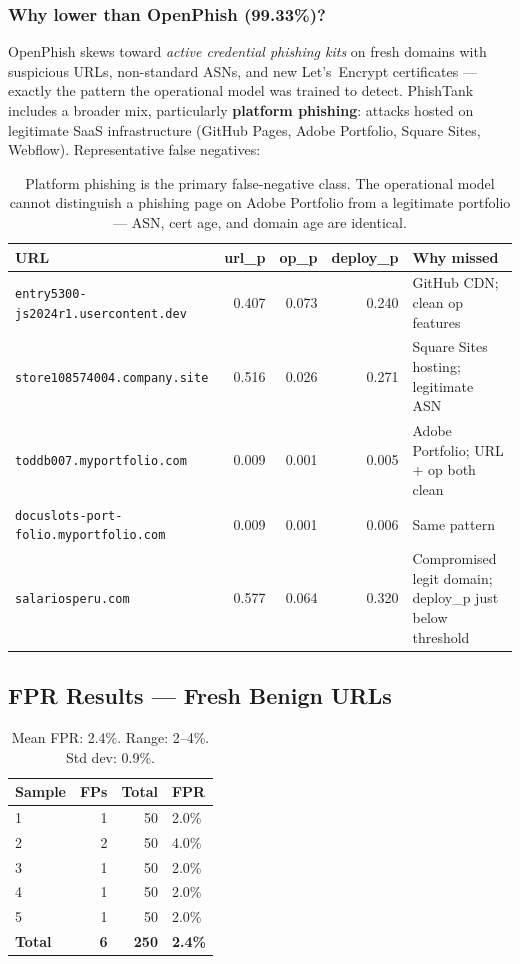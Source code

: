 \documentclass[11pt,a4paper]{article}
\newcommand{\code}[1]{\texttt{#1}}
\begin{document}
\subsubsection*{Why lower than OpenPhish (99.33\%)?}

OpenPhish skews toward \textit{active credential phishing kits} on
fresh domains with suspicious URLs, non-standard ASNs, and new
Let's~Encrypt certificates --- exactly the pattern the operational
model was trained to detect. PhishTank includes a broader mix,
particularly \textbf{platform phishing}: attacks hosted on legitimate
SaaS infrastructure (GitHub Pages, Adobe Portfolio, Square Sites,
Webflow). Representative false negatives:

\begin{table}[h]
\centering
\small
\begin{tabularx}{\textwidth}{>{\raggedright}p{5.8cm}rrr>{\raggedright\arraybackslash}X}
\toprule
URL & url\_p & op\_p & deploy\_p & Why missed \\
\midrule
\code{entry5300-js2024r1.usercontent.dev} & 0.407 & 0.073 & 0.240
  & GitHub CDN; clean op features \\
\code{store108574004.company.site} & 0.516 & 0.026 & 0.271
  & Square Sites hosting; legitimate ASN \\
\code{toddb007.myportfolio.com} & 0.009 & 0.001 & 0.005
  & Adobe Portfolio; URL + op both clean \\
\code{docuslots-port-folio.myportfolio.com} & 0.009 & 0.001 & 0.006
  & Same pattern \\
\code{salariosperu.com} & 0.577 & 0.064 & 0.320
  & Compromised legit domain; deploy\_p just below threshold \\
\bottomrule
\end{tabularx}
\caption{Platform phishing is the primary false-negative class.
  The operational model cannot distinguish a phishing page on
  Adobe Portfolio from a legitimate portfolio --- ASN, cert age, and
  domain age are identical.}
\end{table}

\subsection*{FPR Results --- Fresh Benign URLs}

\begin{table}[h]
\centering
\begin{tabular}{lrrl}
\toprule
Sample & FPs & Total & FPR \\
\midrule
1 & 1 & 50 & 2.0\% \\
2 & 2 & 50 & 4.0\% \\
3 & 1 & 50 & 2.0\% \\
4 & 1 & 50 & 2.0\% \\
5 & 1 & 50 & 2.0\% \\
\midrule
\textbf{Total} & \textbf{6} & \textbf{250} & \textbf{2.4\%} \\
\bottomrule
\end{tabular}
\caption{Mean FPR: 2.4\%. Range: 2--4\%. Std dev: 0.9\%.}
\end{table}
\end{document}
